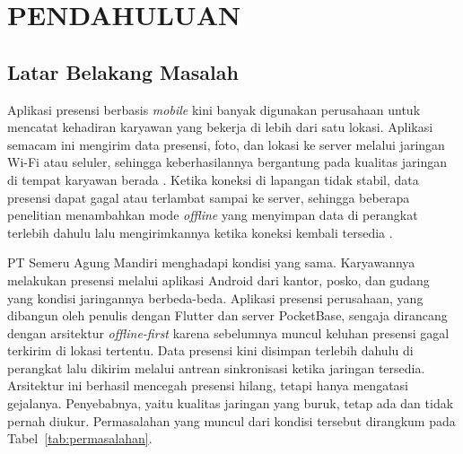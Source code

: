 \chapter{PENDAHULUAN}

\section{Latar Belakang Masalah}
Aplikasi presensi berbasis \textit{mobile} kini banyak digunakan perusahaan untuk mencatat kehadiran karyawan yang bekerja di lebih dari satu lokasi. Aplikasi semacam ini mengirim data presensi, foto, dan lokasi ke server melalui jaringan Wi-Fi atau seluler, sehingga keberhasilannya bergantung pada kualitas jaringan di tempat karyawan berada \parencite{ismail2023presensi,rokhman2026personalia}. Ketika koneksi di lapangan tidak stabil, data presensi dapat gagal atau terlambat sampai ke server, sehingga beberapa penelitian menambahkan mode \textit{offline} yang menyimpan data di perangkat terlebih dahulu lalu mengirimkannya ketika koneksi kembali tersedia \parencite{indah2025offline,rokhman2026personalia}.

PT Semeru Agung Mandiri menghadapi kondisi yang sama. Karyawannya melakukan presensi melalui aplikasi Android dari kantor, posko, dan gudang yang kondisi jaringannya berbeda-beda. Aplikasi presensi perusahaan, yang dibangun oleh penulis dengan Flutter dan server PocketBase, sengaja dirancang dengan arsitektur \textit{offline-first} karena sebelumnya muncul keluhan presensi gagal terkirim di lokasi tertentu. Data presensi kini disimpan terlebih dahulu di perangkat lalu dikirim melalui antrean sinkronisasi ketika jaringan tersedia. Arsitektur ini berhasil mencegah presensi hilang, tetapi hanya mengatasi gejalanya. Penyebabnya, yaitu kualitas jaringan yang buruk, tetap ada dan tidak pernah diukur. Permasalahan yang muncul dari kondisi tersebut dirangkum pada Tabel~\ref{tab:permasalahan}.

